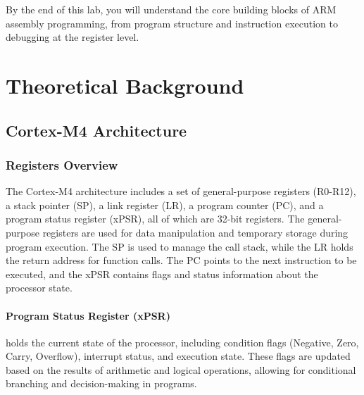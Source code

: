 By the end of this lab, you will understand the core building blocks of ARM assembly programming, from program structure and instruction execution to debugging at the register level.

\newpage
{}
\localtableofcontents
\bigskip
\newpage
\section{Theoretical Background}
\subsection{Cortex-M4 Architecture}
\subsubsection{Registers Overview}
The Cortex-M4 architecture includes a set of general-purpose registers (R0-R12), a stack pointer (SP), a link register (LR), a program counter (PC), and a program status register (xPSR), all of which are 32-bit registers. The general-purpose registers are used for data manipulation and temporary storage during program execution. The SP is used to manage the call stack, while the LR holds the return address for function calls. The PC points to the next instruction to be executed, and the xPSR contains flags and status information about the processor state.
\paragraph{Program Status Register (xPSR)}
holds the current state of the processor, including condition flags (Negative, Zero, Carry, Overflow), interrupt status, and execution state. These flags are updated based on the results of arithmetic and logical operations, allowing for conditional branching and decision-making in programs.

